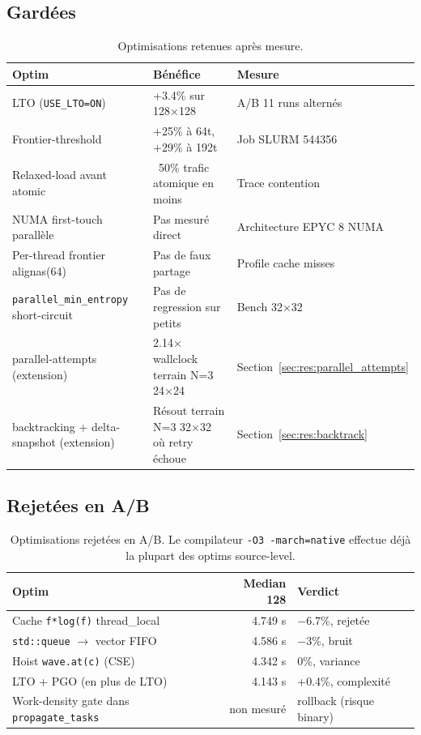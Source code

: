 \subsection{Gardées}

\begin{table}[H]
\centering
\begin{tabularx}{\textwidth}{lXl}
\toprule
\textbf{Optim} & \textbf{Bénéfice} & \textbf{Mesure} \\
\midrule
LTO (\texttt{USE\_LTO=ON}) & +3.4\% sur 128×128 & A/B 11 runs alternés \\
Frontier-threshold & +25\% à 64t, +29\% à 192t & Job SLURM 544356 \\
Relaxed-load avant atomic & ~50\% trafic atomique en moins & Trace contention \\
NUMA first-touch parallèle & Pas mesuré direct & Architecture EPYC 8 NUMA \\
Per-thread frontier alignas(64) & Pas de faux partage & Profile cache misses \\
\texttt{parallel\_min\_entropy} short-circuit & Pas de regression sur petits & Bench 32×32 \\
parallel-attempts (extension) & 2.14× wallclock terrain N=3 24×24 & Section~\ref{sec:res:parallel_attempts} \\
backtracking + delta-snapshot (extension) & Résout terrain N=3 32×32 où retry échoue & Section~\ref{sec:res:backtrack} \\
\bottomrule
\end{tabularx}
\caption{Optimisations retenues après mesure.}
\label{tab:res:kept}
\end{table}

\subsection{Rejetées en A/B}

\begin{table}[H]
\centering
\small
\begin{tabularx}{\textwidth}{XrX}
\toprule
\textbf{Optim} & \textbf{Median 128} & \textbf{Verdict} \\
\midrule
Cache \texttt{f*log(f)} thread\_local & 4.749 s & $-$6.7\%, rejetée \\
\texttt{std::queue} $\to$ vector FIFO & 4.586 s & $-$3\%, bruit \\
Hoist \texttt{wave.at(c)} (CSE) & 4.342 s & 0\%, variance \\
LTO + PGO (en plus de LTO) & 4.143 s & +0.4\%, complexité \\
Work-density gate dans \texttt{propagate\_tasks} & non mesuré & rollback (risque binary) \\
\bottomrule
\end{tabularx}
\caption{Optimisations rejetées en A/B. Le compilateur \texttt{-O3 -march=native} effectue déjà la plupart des optims source-level.}
\label{tab:res:rejected}
\end{table}

